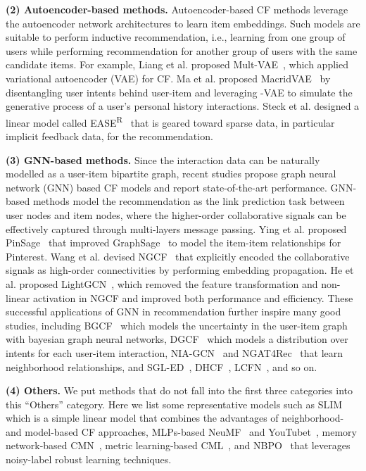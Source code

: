 \documentclass[sigconf,authorversion]{acmart}
\begin{document}
\textbf{(2) Autoencoder-based methods.}
Autoencoder-based CF methods leverage the autoencoder network architectures to learn item embeddings. Such models are suitable to perform inductive recommendation, i.e., learning from one group of users while performing recommendation for another group of users with the same candidate items. For example, 
Liang et al. proposed Mult-VAE~\cite{MVAE}, which applied variational autoencoder (VAE) for CF. 
Ma et al. proposed MacridVAE~\cite{MacridVAE} by disentangling user intents behind user-item and leveraging -VAE to simulate the generative process of a user’s personal history interactions.
Steck et al. designed a linear model called EASE\textsuperscript{R}~\cite{EASE} that is geared toward sparse data, in particular implicit feedback data, for the recommendation.

\textbf{(3) GNN-based methods.}
Since the interaction data can be naturally modelled as a user-item bipartite graph, 
recent studies propose graph neural network (GNN) based CF models and report state-of-the-art performance.
GNN-based methods model the recommendation as the link prediction task between user nodes and item nodes, 
where the higher-order collaborative signals can be effectively captured through multi-layers message passing.
Ying et al. proposed PinSage~\cite{PinSage} that improved GraphSage~\cite{hamilton2017inductive} to model the item-item relationships for Pinterest.
Wang et al. devised NGCF~\cite{NGCF} that explicitly encoded the collaborative signals as high-order connectivities by performing embedding propagation.
He et al. proposed LightGCN~\cite{LightGCN}, which removed the feature transformation and non-linear activation in NGCF and improved both performance and efficiency.
These successful applications of GNN in recommendation further inspire many good studies, including BGCF~\cite{BGCF} which models the uncertainty in the user-item graph with bayesian graph neural networks, DGCF~\cite{DGCF} which models a distribution over intents for each user-item interaction, NIA-GCN~\cite{NIA-GCN} and NGAT4Rec~\cite{NGAT4Rec} that learn neighborhood relationships, and SGL-ED~\cite{SGL-ED}, DHCF~\cite{DHCF}, LCFN~\cite{LCFN}, and so on.










\textbf{(4) Others.}
We put methods that do not fall into the first three categories into this ``Others'' category. Here we list some representative models such as SLIM~\cite{SLIM} which is a simple linear model that combines the advantages of neighborhood- and model-based CF approaches, MLPs-based NeuMF~\cite{NeuMF} and YouTubet~\cite{YouTubeNet},  memory network-based CMN~\cite{CMN}, metric learning-based CML~\cite{CML}, and NBPO~\cite{NBPO} that leverages noisy-label robust learning techniques.
\end{document}
